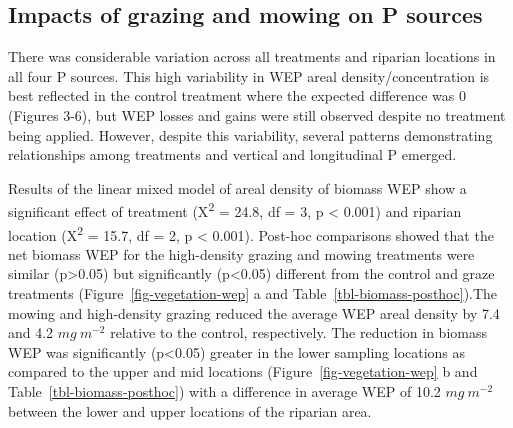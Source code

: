 \documentclass[
]{agujournal2019}
\begin{document}
\subsection{Impacts of grazing and mowing on P
sources}\label{impacts-of-grazing-and-mowing-on-p-sources}

There was considerable variation across all treatments and riparian
locations in all four P sources. This high variability in WEP areal
density/concentration is best reflected in the control treatment where
the expected difference was 0 (Figures 3-6), but WEP losses and gains
were still observed despite no treatment being applied. However, despite
this variability, several patterns demonstrating relationships among
treatments and vertical and longitudinal P emerged.

Results of the linear mixed model of areal density of biomass WEP show a
significant effect of treatment (X\textsuperscript{2} = 24.8, df = 3, p
\textless{} 0.001) and riparian location (X\textsuperscript{2} = 15.7,
df = 2, p \textless{} 0.001). Post-hoc comparisons showed that the net
biomass WEP for the high-density grazing and mowing treatments were
similar (p\textgreater0.05) but significantly (p\textless0.05) different
from the control and graze treatments (Figure~\ref{fig-vegetation-wep} a
and Table~\ref{tbl-biomass-posthoc}).The mowing and high-density grazing
reduced the average WEP areal density by 7.4 and 4.2 \(mg~m^{-2}\)
relative to the control, respectively. The reduction in biomass WEP was
significantly (p\textless0.05) greater in the lower sampling locations
as compared to the upper and mid locations
(Figure~\ref{fig-vegetation-wep} b and Table~\ref{tbl-biomass-posthoc})
with a difference in average WEP of 10.2 \(mg~m^{-2}\) between the lower
and upper locations of the riparian area.
\end{document}
